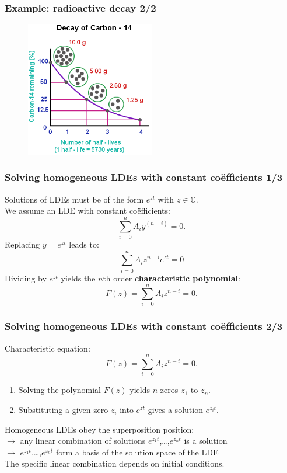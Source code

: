 \begin{frame}
\frametitle{Example: radioactive decay 2/2}
\begin{figure}
\includegraphics[width=0.5\textwidth]{decay-of-carbon-14.png}
\end{figure}
\end{frame}

\begin{frame}
\frametitle{Solving homogeneous LDEs with constant coëfficients 1/3}
Solutions of LDEs must be of the form $e^{zt}$ with $z \in \mathbb{C}$. \\
We assume an LDE with constant coëfficients:
\begin{equation*}
\sum_{i=0}^n A_i y^{(n-i)} = 0.
\end{equation*}
Replacing $y = e^{zt}$ leads to:
\begin{equation*}
\sum_{i=0}^n A_i z^{n-i} e^{zt} = 0
\end{equation*}
Dividing by $e^{zt}$ yields the $n$th order \textbf{characteristic polynomial}:
\begin{equation*}
F(z) = \sum_{i=0}^n A_i z^{n-i} = 0.
\end{equation*}
\end{frame}

\begin{frame}
\frametitle{Solving homogeneous LDEs with constant coëfficients 2/3}
Characteristic equation:
\begin{equation*}
F(z) = \sum_{i=0}^n A_i z^{n-i} = 0.
\end{equation*}
\begin{enumerate}
\item Solving the polynomial $F(z)$ yields $n$ zeros $z_1$ to $z_n$.
\item Substituting a given zero $z_i$ into $e^{zt}$ gives a solution $e^{z_it}$.
\end{enumerate}
Homogeneous LDEs obey the superposition position: \\
$\rightarrow$ any linear combination of solutions $e^{z_1t}$,\ldots,$e^{z_nt}$ is a solution \pause \\
$\rightarrow$ $e^{z_1t}$,\ldots,$e^{z_nt}$ form a basis of the solution space of the LDE \\
The specific linear combination depends on initial conditions.
\end{frame}


